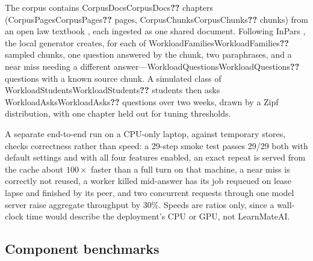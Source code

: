 \documentclass[conference]{IEEEtran}
\newcommand{\val}[1]{\ifcsname #1\endcsname\csname #1\endcsname\else\textbf{??}\fi}
\newcommand{\sys}{LearnMateAI}
\begin{document}
The corpus contains \val{CorpusDocs} chapters (\val{CorpusPages} pages, \val{CorpusChunks} chunks) from an
open law textbook \cite{valbrune2019bizlaw}, each ingested as one shared document. Following InPars
\cite{bonifacio2022inpars}, the local generator creates, for each of \val{WorkloadFamilies} sampled chunks,
one question answered by the chunk, two paraphrases, and a near miss needing a different
answer---\val{WorkloadQuestions} questions with a known source chunk. A simulated class of
\val{WorkloadStudents} students then
asks \val{WorkloadAsks} questions over two weeks, drawn by a Zipf distribution, with one chapter held out for
tuning thresholds.

A separate end-to-end run on a CPU-only laptop, against temporary stores, checks correctness rather than
speed: a 29-step smoke test passes 29/29 both with default settings and with all four features enabled, an
exact repeat is served from the cache about $100\times$ faster than a full turn on that machine, a near miss
is correctly not reused, a worker killed mid-answer has its job requeued on lease lapse and finished by its
peer, and two concurrent requests through one model server raise aggregate throughput by 30\%. Speeds are
ratios only, since a wall-clock time would describe the deployment's CPU or GPU, not \sys{}.

\subsection{Component benchmarks}
\end{document}
